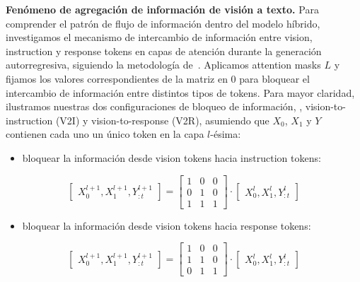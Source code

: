 \documentclass[10pt,twocolumn,letterpaper]{article}
\begin{document}
\noindent\textbf{Fenómeno de agregación de información de visión a texto.}
Para comprender el patrón de flujo de información dentro del modelo híbrido, investigamos el mecanismo de intercambio de información entre vision, instruction y response tokens en capas de atención durante la generación autorregresiva, siguiendo la metodología de~\cite{kaduri2025whatsintheimage}.
Aplicamos attention masks $L$ y fijamos los valores correspondientes de la matriz en 0 para bloquear el intercambio de información entre distintos tipos de tokens.
Para mayor claridad, ilustramos nuestras dos configuraciones de bloqueo de información, \ie, vision-to-instruction (V2I) y vision-to-response (V2R),
asumiendo que $X_0$, $X_1$ y $Y$ contienen cada uno un único token en la capa $l$-ésima: 

\begin{itemize}
    \item \noindent bloquear la información desde vision tokens hacia instruction tokens:
\end{itemize}
\begin{equation}
    \begin{bmatrix}
    X^{l+1}_0,X^{l+1}_1,Y^{l+1}_{:t}
    \end{bmatrix} = \begin{bmatrix}
    1 & 0 & 0 \\
    0 & 1 & 0 \\
    1 & 1 & 1
    \end{bmatrix}\cdot
    \begin{bmatrix}
    X^{l}_0,X^{l}_1,Y^{l}_{:t}
    \end{bmatrix}
\label{eq:block_v2i}
\end{equation}
\begin{itemize}
    \item bloquear la información desde vision tokens hacia response tokens:
\end{itemize}
\begin{equation}
\begin{bmatrix}
    X^{l+1}_0,X^{l+1}_1,Y^{l+1}_{:t}
    \end{bmatrix} = \begin{bmatrix}
1 & 0 & 0 \\
1 & 1 & 0 \\
0 & 1 & 1
\end{bmatrix}\cdot
\begin{bmatrix}
X^{l}_0,X^{l}_1,Y^{l}_{:t}
\end{bmatrix}
\label{eq:block_v2r}
\end{equation}
\end{document}
